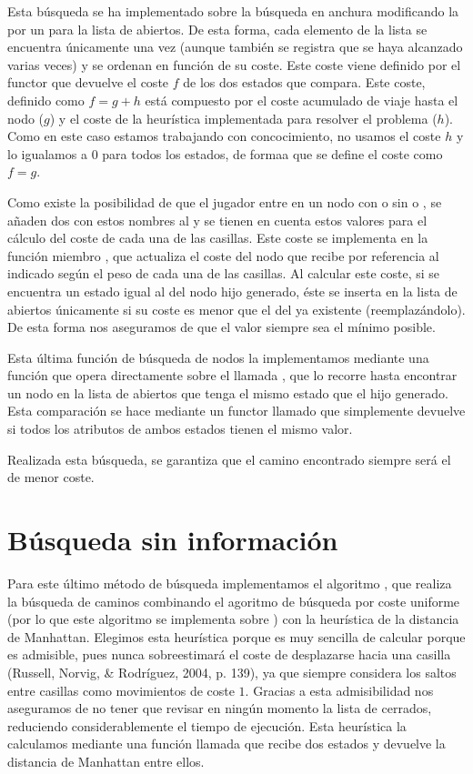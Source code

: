Esta búsqueda se ha implementado sobre la búsqueda en anchura modificando la  por un  para la lista de abiertos.
De esta forma, cada elemento de la lista se encuentra únicamente una vez (aunque también se registra que se haya alcanzado varias veces) y se ordenan en función de su coste.
Este coste viene definido por el functor  que devuelve el coste $f$ de los dos estados que compara.
Este coste, definido como $f=g+h$ está compuesto por el coste acumulado de viaje hasta el nodo ($g$) y el coste de la heurística implementada para resolver el problema ($h$).
Como en este caso estamos trabajando con concocimiento, no usamos el coste $h$ y lo igualamos a $0$ para todos los estados, de formaa que se define el coste como $f=g$.

Como existe la posibilidad de que el jugador entre en un nodo con o sin  o , se añaden dos  con estos nombres al  y se tienen en cuenta estos valores para el cálculo del coste de cada una de las casillas.
Este coste se implementa en la función miembro , que actualiza el coste del nodo que recibe por referencia al indicado según el peso de cada una de las casillas.
Al calcular este coste, si se encuentra un estado igual al del nodo hijo generado, éste se inserta en la lista de abiertos únicamente si su coste es menor que el del ya existente (reemplazándolo).
De esta forma nos aseguramos de que el valor siempre sea el mínimo posible.

Esta última función de búsqueda de nodos la implementamos mediante una función que opera directamente sobre el  llamada , que lo recorre hasta encontrar un nodo en la lista de abiertos que tenga el mismo estado que el hijo generado.
Esta comparación se hace mediante un functor llamado  que simplemente devuelve si todos los atributos de ambos estados tienen el mismo valor.

Realizada esta búsqueda, se garantiza que el camino encontrado siempre será el de menor coste.

\section{Búsqueda sin información}\label{belkan-sin-info}

Para este último método de búsqueda implementamos el algoritmo , que realiza la búsqueda de caminos combinando el agoritmo de búsqueda por coste uniforme (por lo que este algoritmo se implementa sobre ) con la heurística de la distancia de Manhattan.
Elegimos esta heurística porque es muy sencilla de calcular porque es admisible, pues nunca sobreestimará el coste de desplazarse hacia una casilla (Russell, Norvig, \& Rodríguez, 2004, p. 139), ya que siempre considera los saltos entre casillas como movimientos de coste $1$.
Gracias a esta admisibilidad nos aseguramos de no tener que revisar en ningún momento la lista de cerrados, reduciendo considerablemente el tiempo de ejecución.
Esta heurística la calculamos mediante una función llamada  que recibe dos estados y devuelve la distancia de Manhattan entre ellos.

